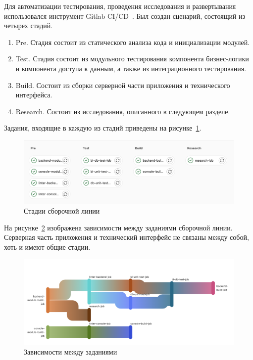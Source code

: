 Для автоматизации тестирования, проведения исследования и развертывания использовался инструмент Gitlab CI/CD~\cite{ci}. Был создан сценарий, состоящий из четырех стадий. 
\begin{enumerate}[label=\arabic*)]
	\item Pre. Стадия состоит из статического анализа кода и инициализации модулей. 
	\item Test. Стадия состоит из модульного тестирования компонента бизнес-логики и компонента доступа к данным, а также из интеграционного тестирования.
	\item Build. Состоит из сборки серверной части приложения и технического интерфейса.
	\item Research. Состоит из исследования, описанного в следующем разделе.
\end{enumerate}
Задания, входящие в каждую из стадий приведены на рисунке~\ref{stages}. 
\begin{figure}[!h]
	\centering
	\includegraphics[width=\textwidth]{image/stages}
	\caption{Стадии сборочной линии}
	\label{stages}
\end{figure}


На рисунке~\ref{needs} изображена зависимости между заданиями сборочной линии. Серверная часть приложения и технический интерфейс не связаны между собой, хоть и имеют общие стадии.
\begin{figure}[!h]
	\centering
	\includegraphics[width=\textwidth]{image/needs}
	\caption{Зависимости между заданиями}
	\label{needs}
\end{figure}




